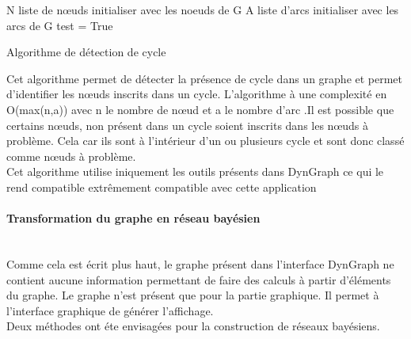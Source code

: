 \documentclass[conference]{IEEEtran}
\begin{document}
 \begin{algorithm}[H]
 N liste de nœuds initialiser avec les noeuds de G\;
 A liste d'arcs initialiser avec les arcs de G\;
 test = True\;
\caption{Algorithme de détection de cycle}
\end{algorithm}
\vspace{0.3cm}
Cet algorithme permet de détecter la présence de cycle dans un graphe et permet d'identifier les nœuds inscrits dans un cycle. L'algorithme à une complexité en O(max(n,a)) avec n le nombre de nœud et a le nombre d'arc .Il est possible que certains nœuds, non présent dans un cycle soient inscrits dans les nœuds à problème. Cela car ils sont à l'intérieur d'un ou plusieurs cycle et sont donc classé comme nœuds à problème. \\
Cet algorithme utilise iniquement les outils présents dans DynGraph ce qui le rend compatible extrêmement compatible avec cette application\\

\paragraph{Transformation du graphe en réseau bayésien \hfill }
\\ Comme cela est écrit plus haut, le graphe présent dans l'interface DynGraph ne contient aucune information permettant de faire des calculs à partir d'éléments du graphe. Le graphe n'est présent que pour la partie graphique. Il permet à l'interface graphique de générer l'affichage.\\
Deux méthodes ont éte envisagées pour la construction de réseaux bayésiens. \\
\end{document}
